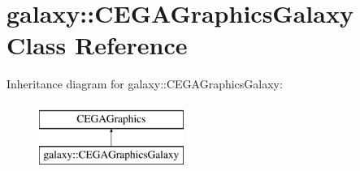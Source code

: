 \hypertarget{classgalaxy_1_1_c_e_g_a_graphics_galaxy}{
\section{galaxy::CEGAGraphicsGalaxy Class Reference}
\label{classgalaxy_1_1_c_e_g_a_graphics_galaxy}
}
Inheritance diagram for galaxy::CEGAGraphicsGalaxy:\begin{figure}[H]
\begin{center}
\leavevmode
\includegraphics[height=2cm]{classgalaxy_1_1_c_e_g_a_graphics_galaxy}
\end{center}
\end{figure}
